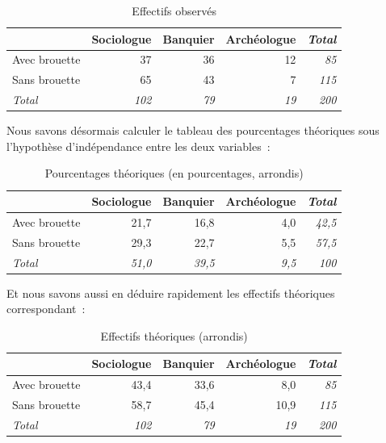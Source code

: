 \documentclass[a4paper,10pt,twoside,francais]{report}
\begin{document}
\begin{table}[H]
  \begin{center}
    \begin{tabular}{lrrr>{\itshape}r}
      \toprule
      & Sociologue & Banquier & Archéologue  & Total\\
      \midrule
      Avec brouette &  37 & 36 & 12 & 85 \\
      Sans brouette &  65 & 43 & 7 & 115 \\
      \textit{Total} & \textit{102} & \textit{79} & \textit{19} & \textit{200}\\
      \bottomrule
    \end{tabular}
    \caption{Effectifs observés}
    \label{effobs}
  \end{center}
\end{table}


Nous savons désormais calculer le tableau des pourcentages théoriques
sous l'hypothèse d'indépendance entre les deux variables~:

\begin{table}[H]
  \begin{center}
    \begin{tabular}{lrrr>{\itshape}r}
      \toprule
      & Sociologue & Banquier & Archéologue  & Total\\
      \midrule
      Avec brouette &  21,7 & 16,8 & 4,0 & 42,5 \\
      Sans brouette &  29,3 & 22,7 & 5,5 & 57,5 \\
      \textit{Total} & \textit{51,0} & \textit{39,5} & \textit{9,5} & \textit{100}\\
      \bottomrule
    \end{tabular}
    \caption{Pourcentages théoriques (en pourcentages, arrondis)}
    \label{pourcthq}
  \end{center}
\end{table}

Et nous savons aussi en déduire rapidement les effectifs théoriques
correspondant~:

\begin{table}[H]
  \begin{center}
    \begin{tabular}{lrrr>{\itshape}r}
      \toprule
      & Sociologue & Banquier & Archéologue  & Total\\
      \midrule
      Avec brouette &  43,4 & 33,6 & 8,0 &  85\\
      Sans brouette &  58,7 & 45,4 & 10,9 &  115\\
      \textit{Total} & \textit{102} & \textit{79} & \textit{19} & \textit{200}\\
      \bottomrule
    \end{tabular}
    \caption{Effectifs théoriques (arrondis)}
    \label{effthq}
  \end{center}
\end{table}
\end{document}
